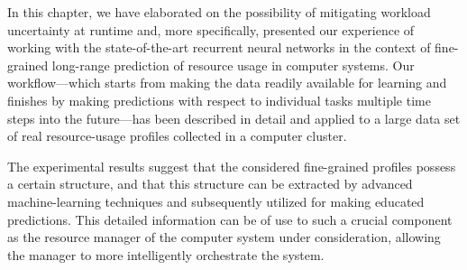 In this chapter, we have elaborated on the possibility of mitigating workload
uncertainty at runtime and, more specifically, presented our experience of
working with the state-of-the-art recurrent neural networks in the context of
fine-grained long-range prediction of resource usage in computer systems. Our
workflow---which starts from making the data readily available for learning and
finishes by making predictions with respect to individual tasks multiple time
steps into the future---has been described in detail and applied to a large data
set of real resource-usage profiles collected in a computer cluster.

The experimental results suggest that the considered fine-grained profiles
possess a certain structure, and that this structure can be extracted by
advanced machine-learning techniques and subsequently utilized for making
educated predictions. This detailed information can be of use to such a crucial
component as the resource manager of the computer system under consideration,
allowing the manager to more intelligently orchestrate the system.
